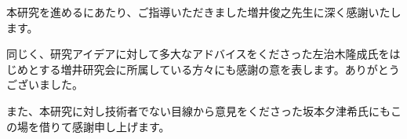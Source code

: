 \begin{acknowledgment}

本研究を進めるにあたり、ご指導いただきました増井俊之先生に深く感謝いたします。

同じく、研究アイデアに対して多大なアドバイスをくださった左治木隆成氏をはじめとする増井研究会に所属している方々にも感謝の意を表します。ありがとうございました。

また、本研究に対し技術者でない目線から意見をくださった坂本夕津希氏にもこの場を借りて感謝申し上げます。

\end{acknowledgment}
